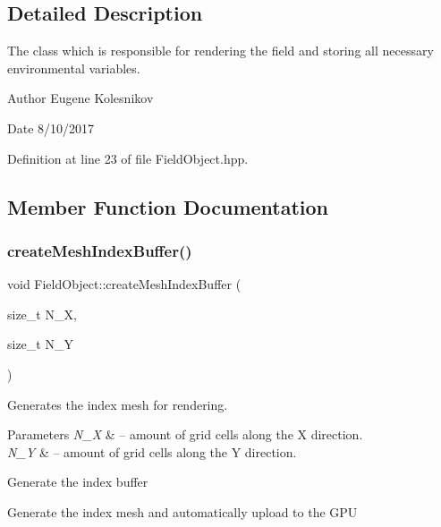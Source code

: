 \subsection{Detailed Description}
The class which is responsible for rendering the field and storing all necessary environmental variables. 

\begin{DoxyAuthor}{Author}
Eugene Kolesnikov 
\end{DoxyAuthor}
\begin{DoxyDate}{Date}
8/10/2017 
\end{DoxyDate}


Definition at line 23 of file Field\+Object.\+hpp.



\subsection{Member Function Documentation}
\mbox{\label{class_field_object_a33d5a7b1230bc5b9d5f29b2762d9d002}} 
\subsubsection{\texorpdfstring{create\+Mesh\+Index\+Buffer()}{createMeshIndexBuffer()}}
{\footnotesize\ttfamily void Field\+Object\+::create\+Mesh\+Index\+Buffer (\begin{DoxyParamCaption}\item[{size\+\_\+t}]{N\+\_\+X,  }\item[{size\+\_\+t}]{N\+\_\+Y }\end{DoxyParamCaption})\hspace{0.3cm}{\ttfamily [protected]}}



Generates the index mesh for rendering. 


\begin{DoxyParams}{Parameters}
{\em N\+\_\+X} & -- amount of grid cells along the X direction. \\
\hline
{\em N\+\_\+Y} & -- amount of grid cells along the Y direction. \\
\hline
\end{DoxyParams}
Generate the index buffer

Generate the index mesh and automatically upload to the G\+PU 

